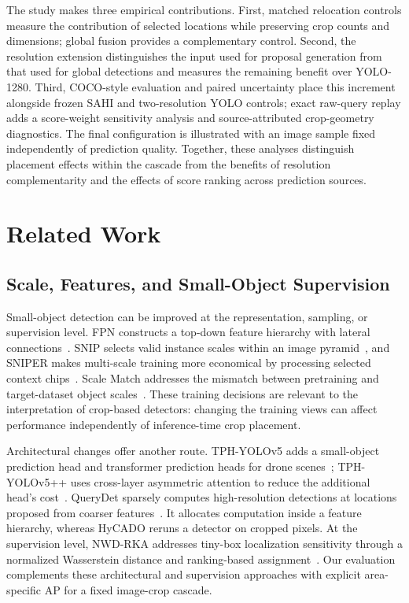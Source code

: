 \documentclass[journal]{IEEEtran}
\begin{document}
The study makes three empirical contributions. First, matched relocation controls measure the contribution of selected locations while preserving crop counts and dimensions; global fusion provides a complementary control. Second, the resolution extension distinguishes the input used for proposal generation from that used for global detections and measures the remaining benefit over YOLO-1280. Third, COCO-style evaluation and paired uncertainty place this increment alongside frozen SAHI and two-resolution YOLO controls; exact raw-query replay adds a score-weight sensitivity analysis and source-attributed crop-geometry diagnostics. The final configuration is illustrated with an image sample fixed independently of prediction quality. Together, these analyses distinguish placement effects within the cascade from the benefits of resolution complementarity and the effects of score ranking across prediction sources.

\section{Related Work}
\subsection{Scale, Features, and Small-Object Supervision}
Small-object detection can be improved at the representation, sampling, or supervision level. FPN constructs a top-down feature hierarchy with lateral connections~\cite{lin2017fpn}. SNIP selects valid instance scales within an image pyramid~\cite{singh2018snip}, and SNIPER makes multi-scale training more economical by processing selected context chips~\cite{singh2018sniper}. Scale Match addresses the mismatch between pretraining and target-dataset object scales~\cite{yu2020tinyperson}. These training decisions are relevant to the interpretation of crop-based detectors: changing the training views can affect performance independently of inference-time crop placement.

Architectural changes offer another route. TPH-YOLOv5 adds a small-object prediction head and transformer prediction heads for drone scenes~\cite{zhu2021tph}; TPH-YOLOv5++ uses cross-layer asymmetric attention to reduce the additional head's cost~\cite{zhao2023tphplus}. QueryDet sparsely computes high-resolution detections at locations proposed from coarser features~\cite{yang2022querydet}. It allocates computation inside a feature hierarchy, whereas HyCADO reruns a detector on cropped pixels. At the supervision level, NWD-RKA addresses tiny-box localization sensitivity through a normalized Wasserstein distance and ranking-based assignment~\cite{xu2022nwd}. Our evaluation complements these architectural and supervision approaches with explicit area-specific AP for a fixed image-crop cascade.
\end{document}
